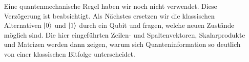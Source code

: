 Eine quantenmechanische Regel haben wir noch nicht verwendet. Diese Verzögerung ist beabsichtigt. Als Nächstes ersetzen wir die klassischen Alternativen \(\left\lvert0\right\rangle\) und \(\left\lvert1\right\rangle\) durch ein Qubit und fragen, welche neuen Zustände möglich sind. Die hier eingeführten Zeilen- und Spaltenvektoren, Skalarprodukte und Matrizen werden dann zeigen, warum sich Quanteninformation so deutlich von einer klassischen Bitfolge unterscheidet.

\begin{classroomqa}
\end{classroomqa}